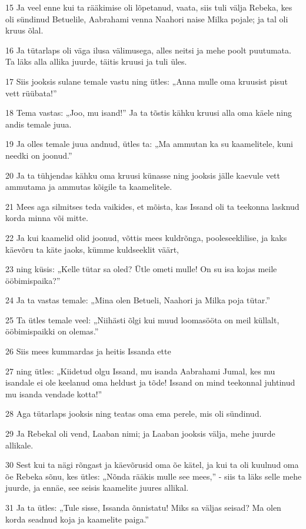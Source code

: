 \par 15 Ja veel enne kui ta rääkimise oli lõpetanud, vaata, siis tuli välja Rebeka, kes oli sündinud Betuelile, Aabrahami venna Naahori naise Milka pojale; ja tal oli kruus õlal.
\par 16 Ja tütarlaps oli väga ilusa välimusega, alles neitsi ja mehe poolt puutumata. Ta läks alla allika juurde, täitis kruusi ja tuli üles.
\par 17 Siis jooksis sulane temale vastu ning ütles: „Anna mulle oma kruusist pisut vett rüübata!”
\par 18 Tema vastas: „Joo, mu isand!” Ja ta tõstis kähku kruusi alla oma käele ning andis temale juua.
\par 19 Ja olles temale juua andnud, ütles ta: „Ma ammutan ka su kaamelitele, kuni needki on joonud.”
\par 20 Ja ta tühjendas kähku oma kruusi künasse ning jooksis jälle kaevule vett ammutama ja ammutas kõigile ta kaamelitele.
\par 21 Mees aga silmitses teda vaikides, et mõista, kas Issand oli ta teekonna lasknud korda minna või mitte.
\par 22 Ja kui kaamelid olid joonud, võttis mees kuldrõnga, pooleseeklilise, ja kaks käevõru ta käte jaoks, kümme kuldseeklit väärt,
\par 23 ning küsis: „Kelle tütar sa oled? Ütle ometi mulle! On su isa kojas meile ööbimispaika?”
\par 24 Ja ta vastas temale: „Mina olen Betueli, Naahori ja Milka poja tütar.”
\par 25 Ta ütles temale veel: „Niihästi õlgi kui muud loomasööta on meil küllalt, ööbimispaikki on olemas.”
\par 26 Siis mees kummardas ja heitis Issanda ette
\par 27 ning ütles: „Kiidetud olgu Issand, mu isanda Aabrahami Jumal, kes mu isandale ei ole keelanud oma heldust ja tõde! Issand on mind teekonnal juhtinud mu isanda vendade kotta!”
\par 28 Aga tütarlaps jooksis ning teatas oma ema perele, mis oli sündinud.
\par 29 Ja Rebekal oli vend, Laaban nimi; ja Laaban jooksis välja, mehe juurde allikale.
\par 30 Sest kui ta nägi rõngast ja käevõrusid oma õe kätel, ja kui ta oli kuulnud oma õe Rebeka sõnu, kes ütles: „Nõnda rääkis mulle see mees,” - siis ta läks selle mehe juurde, ja ennäe, see seisis kaamelite juures allikal.
\par 31 Ja ta ütles: „Tule sisse, Issanda õnnistatu! Miks sa väljas seisad? Ma olen korda seadnud koja ja kaamelite paiga.”
